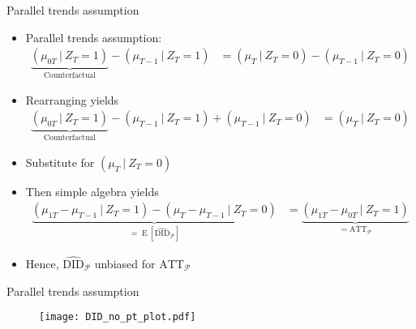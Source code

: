 \documentclass[table, xcolor={dvipsnames}, 9pt]{beamer}
\newcommand\given[1][]{\:#1\vert\:}
\theoremstyle{newstyle}
\DeclareMathOperator{\E}{\mathrm{E}}
\begin{document}
\begin{frame}{Parallel trends assumption}
\begin{itemize}
\item Parallel trends assumption: \pause
\begin{align*}  
\underbrace{\left(\mu_{0T}\given Z_T = 1\right)}_{\text{Counterfactual}} - \left(\mu_{T-1} \given Z_T = 1\right) & = \left(\mu_{T} \given Z_T = 0\right) - \left(\mu_{T-1} \given Z_T = 0\right)
\end{align*}
\item \pause Rearranging yields
\begin{align*}
\underbrace{\left(\mu_{0T}\given Z_T = 1\right)}_{\text{Counterfactual}} - \left(\mu_{T-1} \given Z_T = 1\right) + \left(\mu_{T-1} \given Z_T = 0\right) & = \left(\mu_{T} \given Z_T = 0\right)
\end{align*}
\item \pause Substitute for $\left(\mu_{T} \given Z_T = 0\right)$
\item \pause Then simple algebra yields \pause 
\begin{align*}
\underbrace{\left(\mu_{1T} - \mu_{T-1} \given Z_T = 1\right) - \left(\mu_{T} - \mu_{T-1} \given Z_T = 0\right)}_{ = \E\left[\widehat{\text{DID}}_{\mathcal{P}}\right]} & = \underbrace{\left(\mu_{1T} - \mu_{0T} \given Z_T = 1\right)}_{ = \text{ATT}_{\mathcal{P}}}
\end{align*}
\item \pause Hence, $\widehat{\text{DID}}_{\mathcal{P}}$ unbiased for $\text{ATT}_{\mathcal{P}}$
\end{itemize}
\end{frame}
\begin{frame}{Parallel trends assumption}
\begin{figure}[H]
\texttt{[image: DID\_no\_pt\_plot.pdf]}
\end{figure}
\end{frame}
\end{document}
